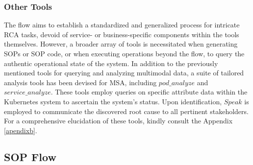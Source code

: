 \subsubsection{Other Tools}



The flow aims to establish a standardized and generalized process for intricate RCA tasks, devoid of service- or business-specific components within the tools themselves. However, a broader array of tools is necessitated when generating SOPs or SOP code, or when executing operations beyond the flow, to query the authentic operational state of the system. In addition to the previously mentioned tools for querying and analyzing multimodal data, a suite of tailored analysis tools has been devised for MSA, including $pod\_analyze$ and $service\_analyze$. These tools employ queries on specific attribute data within the Kubernetes system to ascertain the system's status. Upon identification, $Speak$ is employed to communicate the discovered root cause to all pertinent stakeholders. For a comprehensive elucidation of these tools, kindly consult the Appendix \ref{apendixb}.

\subsection{SOP Flow}




